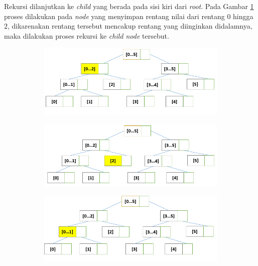\quad Rekursi dilanjutkan ke \textit{child} yang berada pada sisi kiri dari \textit{root}. Pada Gambar \ref{fig:subqueryST5} proses dilakukan pada \textit{node} yang menyimpan rentang nilai dari rentang $0$ hingga $2$, dikarenakan rentang tersebut mencakup rentang yang diinginkan didalamnya, maka dilakukan proses rekursi ke \textit{child node} tersebut.
\begin{figure}[H]
	\begin{subfigure}{.5\textwidth}
		\centering
		\includegraphics[scale=0.3]{assets/images/Query_ST_5.PNG}
		\caption{}
		\label{fig:subqueryST5}
	\end{subfigure}
	\begin{subfigure}{.5\textwidth}
		\centering
		\includegraphics[scale=0.3]{assets/images/Query_ST_6.PNG}
		\caption{}
		\label{fig:subqueryST6}
	\end{subfigure}
	\begin{subfigure}{.5\textwidth}
		\centering \includegraphics[scale=0.3]{assets/images/Query_ST_7.PNG}
		\caption{}
		\label{fig:subqueryST7}

\end{subfigure}
\end{figure}
